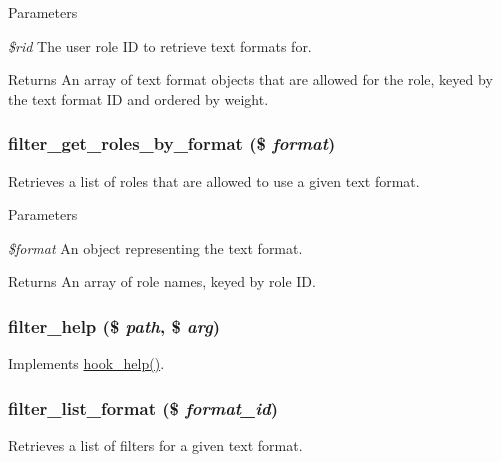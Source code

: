 \begin{DoxyParams}{Parameters}
\item[{\em \$rid}]The user role ID to retrieve text formats for.\end{DoxyParams}
\begin{DoxyReturn}{Returns}
An array of text format objects that are allowed for the role, keyed by the text format ID and ordered by weight. 
\end{DoxyReturn}
\hypertarget{filter_8module_a53d0e4b419852da83e67f815912603b2}{
\subsubsection[{filter\_\-get\_\-roles\_\-by\_\-format}]{\setlength{\rightskip}{0pt plus 5cm}filter\_\-get\_\-roles\_\-by\_\-format (\$ {\em format})}}
\label{filter_8module_a53d0e4b419852da83e67f815912603b2}
Retrieves a list of roles that are allowed to use a given text format.


\begin{DoxyParams}{Parameters}
\item[{\em \$format}]An object representing the text format.\end{DoxyParams}
\begin{DoxyReturn}{Returns}
An array of role names, keyed by role ID. 
\end{DoxyReturn}
\hypertarget{filter_8module_acb973dd946fba16056fe3d0af900af6b}{
\subsubsection[{filter\_\-help}]{\setlength{\rightskip}{0pt plus 5cm}filter\_\-help (\$ {\em path}, \/  \$ {\em arg})}}
\label{filter_8module_acb973dd946fba16056fe3d0af900af6b}
Implements \hyperlink{group__hooks_ga5589c2714a782738e8851c4c90231f0e}{hook\_\-help()}. \hypertarget{filter_8module_a29a31789549de093dd96e9d4f58b41a8}{
\subsubsection[{filter\_\-list\_\-format}]{\setlength{\rightskip}{0pt plus 5cm}filter\_\-list\_\-format (\$ {\em format\_\-id})}}
\label{filter_8module_a29a31789549de093dd96e9d4f58b41a8}
Retrieves a list of filters for a given text format.


